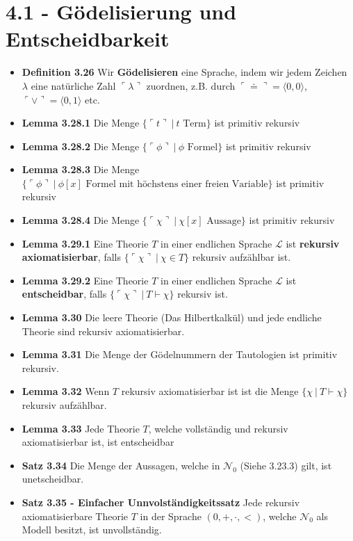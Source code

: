 \documentclass{scrartcl}
\newcommand{\goedel}[1]{\langle#1\rangle}
\newcommand{\goedelnr}[1]{\ulcorner#1\urcorner}
\newcommand{\proves}[0]{\vdash}
\begin{document}
\section*{4.1 - Gödelisierung und Entscheidbarkeit} 
\begin{itemize}
    \item{\textbf{Definition 3.26}} Wir \textbf{Gödelisieren} eine Sprache, indem wir jedem Zeichen $\lambda$ eine natürliche Zahl $\goedelnr{\lambda}$ zuordnen, z.B. durch $\goedelnr{\doteq} = \goedel{0,0}$, $\goedelnr{\vee} = \goedel{0,1}$ etc.
    \item{\textbf{Lemma 3.28.1}} Die Menge $\{\goedelnr{t}\ |\ t \text{ Term}\}$ ist primitiv rekursiv
    \item{\textbf{Lemma 3.28.2}} Die Menge $\{\goedelnr{\phi}\ |\ \phi \text{ Formel}\}$  ist primitiv rekursiv
    \item{\textbf{Lemma 3.28.3}} Die Menge $\{\goedelnr{\phi}\ |\ \phi[x] \text{ Formel mit höchstens einer freien Variable}\}$
    ist primitiv rekursiv
    \item{\textbf{Lemma 3.28.4}} Die Menge $\{\goedelnr{\chi}\ |\ \chi[x] \text{ Aussage}\}$
    ist primitiv rekursiv
    \item{\textbf{Lemma 3.29.1}} Eine Theorie $T$ in einer endlichen Sprache $\mathcal{L}$ ist \textbf{rekursiv axiomatisierbar}, falls $\{\goedelnr{\chi}\ |\ \chi \in T\}$ rekursiv aufzählbar ist.
    \item{\textbf{Lemma 3.29.2}} Eine Theorie $T$ in einer endlichen Sprache $\mathcal{L}$ ist \textbf{entscheidbar}, falls $\{\goedelnr{\chi}\ |\ T \vdash \chi\}$ rekursiv ist.
    \item{\textbf{Lemma 3.30}} Die leere Theorie (Das Hilbertkalkül) und jede endliche Theorie sind rekursiv axiomatisierbar.
    \item{\textbf{Lemma 3.31}} Die Menge der Gödelnummern der Tautologien ist primitiv rekursiv.
    \item{\textbf{Lemma 3.32}} Wenn $T$ rekursiv axiomatisierbar ist ist die Menge $\{\chi\ |\ T \proves \chi\}$ rekursiv aufzählbar.
    \item{\textbf{Lemma 3.33}} Jede Theorie $T$, welche vollständig und rekursiv axiomatisierbar ist, ist entscheidbar
    \item{\textbf{Satz 3.34}} Die Menge der Aussagen, welche in $\mathcal{N}_0$ (Siehe 3.23.3) gilt, ist unetscheidbar.
    \item{\textbf{Satz 3.35 - Einfacher Unnvolständigkeitssatz}} Jede rekursiv axiomatisierbare Theorie $T$ in der Sprache $(0,+,\cdot,<)$, welche $\mathcal{N}_0$ als Modell besitzt, ist unvollständig.
\end{itemize}
\pagebreak
\end{document}
